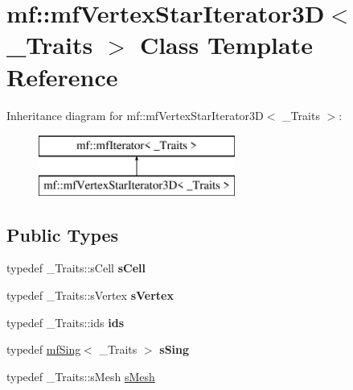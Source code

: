 \hypertarget{classmf_1_1mfVertexStarIterator3D}{
\section{mf::mfVertexStarIterator3D$<$ \_\-Traits $>$ Class Template Reference}
\label{classmf_1_1mfVertexStarIterator3D}
}
Inheritance diagram for mf::mfVertexStarIterator3D$<$ \_\-Traits $>$:\begin{figure}[H]
\begin{center}
\leavevmode
\includegraphics[height=2.000000cm]{classmf_1_1mfVertexStarIterator3D}
\end{center}
\end{figure}
\subsection*{Public Types}
\begin{DoxyCompactItemize}
\item 
\hypertarget{classmf_1_1mfVertexStarIterator3D_a55e757163cbd49e46e75a76033e694d0}{
typedef \_\-Traits::sCell {\bfseries sCell}}
\label{classmf_1_1mfVertexStarIterator3D_a55e757163cbd49e46e75a76033e694d0}

\item 
\hypertarget{classmf_1_1mfVertexStarIterator3D_aae63a088dc8b454ecc35ab4be6e41ccd}{
typedef \_\-Traits::sVertex {\bfseries sVertex}}
\label{classmf_1_1mfVertexStarIterator3D_aae63a088dc8b454ecc35ab4be6e41ccd}

\item 
\hypertarget{classmf_1_1mfVertexStarIterator3D_a663016294ac1e5461047aab8f87ce621}{
typedef \_\-Traits::ids {\bfseries ids}}
\label{classmf_1_1mfVertexStarIterator3D_a663016294ac1e5461047aab8f87ce621}

\item 
\hypertarget{classmf_1_1mfVertexStarIterator3D_a77654608fb1896295c324f7ac213d7ef}{
typedef \hyperlink{classmf_1_1mfSing}{mfSing}$<$ \_\-Traits $>$ {\bfseries sSing}}
\label{classmf_1_1mfVertexStarIterator3D_a77654608fb1896295c324f7ac213d7ef}

\item 
typedef \_\-Traits::sMesh \hyperlink{classmf_1_1mfVertexStarIterator3D_aa45e0318e1153d3b373ec69af44d6710}{sMesh}
\end{DoxyCompactItemize}
